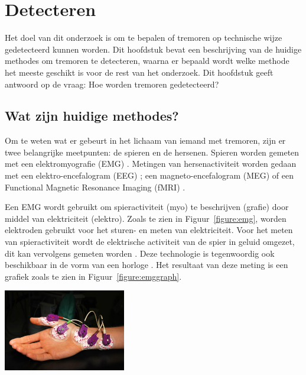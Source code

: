 \section{Detecteren}
\label{section:detection}

Het doel van dit onderzoek is om te bepalen of tremoren op technische wijze gedetecteerd kunnen worden.
Dit hoofdstuk bevat een beschrijving van de huidige methodes om tremoren te detecteren,
waarna er bepaald wordt welke methode het meeste geschikt is voor de rest van het onderzoek.
Dit hoofdstuk geeft antwoord op de vraag: Hoe worden tremoren gedetecteerd?

\subsection{Wat zijn huidige methodes?}

Om te weten wat er gebeurt in het lichaam van iemand met tremoren, zijn er twee belangrijke meetpunten:
de spieren en de hersenen. Spieren worden gemeten met een elektromyografie (EMG) \cite{knf2022,elsevier2022,sips2024}.
Metingen van hersenactiviteit worden gedaan met een elektro-encefalogram (EEG) \cite{knf2022,elsevier2022};
een magneto-encefalogram (MEG) of een Functional Magnetic Resonance Imaging (fMRI) \cite{elsevier2022}.

Een EMG wordt gebruikt om spieractiviteit (myo) te beschrijven (grafie) door middel van elektriciteit (elektro).
Zoals te zien in Figuur~\ref{figure:emg}, worden elektroden gebruikt voor het sturen- en meten van elektriciteit.
Voor het meten van spieractiviteit wordt de elektrische activiteit van de spier in geluid omgezet,
dit kan vervolgens gemeten worden \cite{knf2022,neuro2009,gohel2020,neurostyle2021}.
Deze technologie is tegenwoordig ook beschikbaar in de vorm van een horloge \cite{frontiers2022,sips2024,activinsights2022}.
Het resultaat van deze meting is een grafiek zoals te zien in Figuur~\ref{figure:emggraph}.

\begin{center}
    \includegraphics[width=0.4\textwidth]{./graphics/img-emg.jpg}
    \label{figure:emg}
\end{center}

